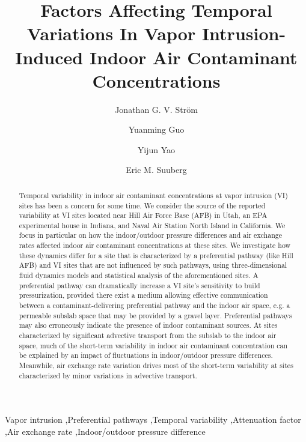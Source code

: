 \documentclass[preprint,12pt]{elsarticle}
\begin{document}
\begin{frontmatter}
\title{Factors Affecting Temporal Variations In Vapor Intrusion-Induced Indoor Air Contaminant Concentrations}

\author[Brown]{Jonathan G. V. Ström}
\author[ASU]{Yuanming Guo}
\author[ASU]{Yijun Yao}
\author[Brown]{Eric M. Suuberg}


\address[Brown]{Brown University, School of Engineering, Providence, RI, USA}
\address[ASU]{Arizona State University, School of Sustainable Engineering and the Building Environment, Tempe, AZ, USA}

\begin{abstract}
Temporal variability in indoor air contaminant concentrations at vapor intrusion (VI) sites has been a concern for some time.
We consider the source of the reported variability at VI sites located near Hill Air Force Base (AFB) in Utah, an EPA experimental house in Indiana, and Naval Air Station North Island in California.
We focus in particular on how the indoor/outdoor pressure differences and air exchange rates affected indoor air contaminant concentrations at these sites.
We investigate how these dynamics differ for a site that is characterized by a preferential pathway (like Hill AFB) and VI sites that are not influenced by such pathways, using three-dimensional fluid dynamics models and statistical analysis of the aforementioned sites.
A preferential pathway can dramatically increase a VI site's sensitivity to build pressurization, provided there exist a medium allowing effective communication between a contaminant-delivering preferential pathway and the indoor air space, e.g. a permeable subslab space that may be provided by a gravel layer.
Preferential pathways may also erroneously indicate the presence of indoor contaminant sources.
At sites characterized by significant advective transport from the subslab to the indoor air space, much of the short-term variability in indoor air contaminant concentration can be explained by an impact of fluctuations in indoor/outdoor pressure differences.
Meanwhile, air exchange rate variation drives most of the short-term variability at sites characterized by minor variations in advective transport.
\end{abstract}

\begin{keyword}
  Vapor intrusion \sep Preferential pathways \sep Temporal variability \sep Attenuation factor \sep Air exchange rate \sep Indoor/outdoor pressure difference
\end{keyword}

\end{frontmatter}
\end{document}

